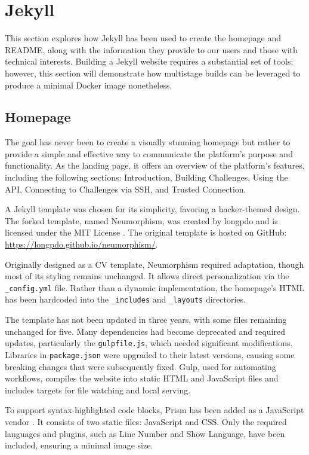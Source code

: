 \section{Jekyll}
This section explores how Jekyll has been used to create the homepage and README, along with the information they provide to our users and those with technical interests. Building a Jekyll website requires a substantial set of tools; however, this section will demonstrate how multistage builds can be leveraged to produce a minimal Docker image nonetheless.

\subsection{Homepage}
The goal has never been to create a visually stunning homepage but rather to provide a simple and effective way to communicate the platform's purpose and functionality. As the landing page, it offers an overview of the platform's features, including the following sections: Introduction, Building Challenges, Using the API, Connecting to Challenges via SSH, and Trusted Connection.

A Jekyll template was chosen for its simplicity, favoring a hacker-themed design. The forked template, named Neumorphism, was created by longpdo and is licensed under the MIT License \parencite{neumorphism}. The original template is hosted on GitHub: \url{https://longpdo.github.io/neumorphism/}.

Originally designed as a CV template, Neumorphism required adaptation, though most of its styling remains unchanged. It allows direct personalization via the \texttt{\_config.yml} file. Rather than a dynamic implementation, the homepage's HTML has been hardcoded into the \texttt{\_includes} and \texttt{\_layouts} directories.

The template has not been updated in three years, with some files remaining unchanged for five. Many dependencies had become deprecated and required updates, particularly the \texttt{gulpfile.js}, which needed significant modifications. Libraries in \texttt{package.json} were upgraded to their latest versions, causing some breaking changes that were subsequently fixed. Gulp, used for automating workflows, compiles the website into static HTML and JavaScript files and includes targets for file watching and local serving.

To support syntax-highlighted code blocks, Prism has been added as a JavaScript vendor \parencite{prismjs}. It consists of two static files: JavaScript and CSS. Only the required languages and plugins, such as Line Number and Show Language, have been included, ensuring a minimal image size.

